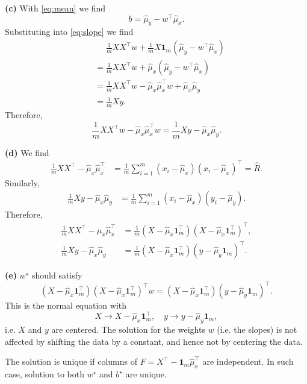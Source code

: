 \documentclass{article}
\makeatletter
\newcommand*{\shifttext}[1]{%
  \settowidth{\@tempdima}{#1}%
  \hspace{-\@tempdima}#1%
}
\newcommand{\plabel}[1]{%
\shifttext{\textbf{#1}\quad}%
}
\makeatother
\begin{document}
\plabel{(c)}%
With \cref{eq:mean} we find
\[ b = \hat{\mu}_y - w^\intercal \hat{\mu}_x. \]
Substituting into \eqref{eq:slope} we find
\begin{align*}
    &\phantom{{}={}} \frac{1}{m}X X^\intercal w + \frac{1}{m}X\mathbf{1}_m (\hat{\mu}_y - w^\intercal \hat{\mu}_x) \\
    &= \frac{1}{m}X X^\intercal w + \hat{\mu}_x (\hat{\mu}_y - w^\intercal \hat{\mu}_x) \\
    &= \frac{1}{m}X X^\intercal w - \hat{\mu}_x \hat{\mu}^\intercal_x w + \hat{\mu}_x\hat{\mu}_y \\
    & = \frac{1}{m} Xy.
\end{align*}
Therefore,
\[ \frac{1}{m}X X^\intercal w - \hat{\mu}_x \hat{\mu}^\intercal_x w = \frac{1}{m} Xy - \hat{\mu}_x\hat{\mu}_y. \]

\plabel{(d)}%
We find
\begin{align*}
    \frac{1}{m}XX^\intercal - \hat{\mu}_x \hat{\mu}_x^\intercal &= \frac{1}{m} \sum_{i=1}^m (x_i - \hat{\mu}_x) (x_i - \hat{\mu}_x)^\intercal = \hat{R}.
\end{align*}
Similarly,
\begin{align*}
    \frac{1}{m}X y - \hat{\mu}_x \hat{\mu}_y &= \frac{1}{m} \sum_{i=1}^m (x_i - \hat{\mu}_x) (y_i - \hat{\mu}_y).
\end{align*}
Therefore,
\begin{align*}
    \frac{1}{m}XX^\intercal - \hat{\mu}_x \hat{\mu}_x^\intercal &= \frac{1}{m}(X - \hat{\mu}_x \mathbf{1}_m^\intercal) (X - \hat{\mu}_x \mathbf{1}_m^\intercal)^\intercal, \\
    \frac{1}{m}X y - \hat{\mu}_x \hat{\mu}_y &= \frac{1}{m}(X - \hat{\mu}_x\mathbf{1}_m^\intercal) (y - \hat{\mu}_y\mathbf{1}_m)^\intercal.
\end{align*}

\plabel{(e)}%
$w^\star$ should satisfy
\[ (X - \hat{\mu}_x \mathbf{1}_m^\intercal) (X - \hat{\mu}_x \mathbf{1}_m^\intercal)^\intercal w = (X - \hat{\mu}_x\mathbf{1}_m^\intercal) (y - \hat{\mu}_y\mathbf{1}_m)^\intercal. \]
This is the normal equation with
\[ X \rightarrow X - \hat{\mu}_x \mathbf{1}_m^\intercal,\quad y \rightarrow y - \hat{\mu}_y \mathbf{1}_m, \]
i.e. $X$ and $y$ are centered.
The solution for the weights $w$ (i.e. the slopes) is not affected by shifting the data by a constant, and hence not by centering the data.
\par
The solution is unique if columns of $F = X^\intercal - \mathbf{1}_m \hat{\mu}_x^\intercal$ are independent.
In such case, solution to both $w^\star$ and $b^\star$ are unique.
\end{document}
